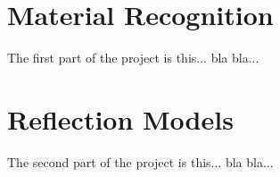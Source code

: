\hypertarget{MaterialRecognition}{
\section{Material Recognition}
\label{MaterialRecognition}%
}
The first part of the project is this...
bla bla...


\hypertarget{ReflectionModels}{
\section{Reflection Models}
\label{ReflectionModels}%
}
The second part of the project is this...
bla bla...



